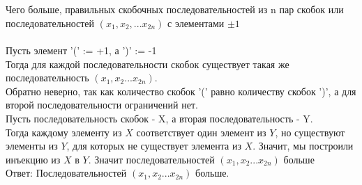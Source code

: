 \documentclass{article}
\begin{document}
\section{}
Чего больше, правильных скобочных последовательностей из n пар скобок или последовательностей $(x_1,x_2,...x_{2n})$ с элементами $\pm1$\\\\
Пусть элемент '(' := +1, а ')' := -1\\
Тогда для каждой последовательности скобок существует такая же последовательность $(x_1, x_2... x_{2n})$.\\
Обратно неверно, так как количество скобок '(' равно количеству скобок ')', а для второй последовательности ограничений нет.\\
Пусть последовательность скобок - X, а вторая последовательность - Y.\\
Тогда каждому элементу из $X$ соответствует один элемент из $Y$, но существуют элементы из $Y$, для которых не существует элемента из $X$. Значит, мы построили инъекцию из $X$ в $Y$. Значит последовательностей $(x_1, x_2... x_{2n})$ больше\\
Ответ: Последовательностей $(x_1, x_2... x_{2n})$ больше.
\end{document}
